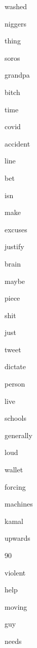 \documentclass[varwidth]{standalone}
\begin{document}
\begin{CJK*}{UTF8}{gbsn}
{{{\colorbox{red!3.695000171661377}{\strut washed}
\colorbox{red!12.72170639038086}{\strut niggers}
\colorbox{red!13.21385383605957}{\strut thing}
\colorbox{red!12.35820198059082}{\strut soros}
\colorbox{red!11.195777893066406}{\strut grandpa}
\colorbox{red!1.2797343730926514}{\strut bitch}
\colorbox{red!9.930908203125}{\strut time}
\colorbox{red!13.842358589172363}{\strut covid}
\colorbox{red!9.157684326171875}{\strut accident}
\colorbox{red!9.801695823669434}{\strut line}
\colorbox{red!11.14346694946289}{\strut bet}
\colorbox{red!11.951952934265137}{\strut isn}
\colorbox{red!12.36168098449707}{\strut make}
\colorbox{red!6.34499454498291}{\strut excuses}
\colorbox{red!5.187213897705078}{\strut justify}
\colorbox{red!11.700725555419922}{\strut brain}
\colorbox{red!11.259617805480957}{\strut maybe}
\colorbox{red!6.049976348876953}{\strut piece}
\colorbox{red!5.421172142028809}{\strut shit}
\colorbox{red!10.404735565185547}{\strut just}
\colorbox{red!11.056079864501953}{\strut tweet}
\colorbox{red!13.45838451385498}{\strut dictate}
\colorbox{red!6.308839797973633}{\strut person}
\colorbox{red!6.482020378112793}{\strut live}
\colorbox{red!5.7783966064453125}{\strut schools}
\colorbox{red!6.54176139831543}{\strut generally}
\colorbox{red!6.977139949798584}{\strut loud}
\colorbox{red!8.854361534118652}{\strut wallet}
\colorbox{red!8.163307189941406}{\strut forcing}
\colorbox{red!5.255404949188232}{\strut machines}
\colorbox{red!13.0840482711792}{\strut kamal}
\colorbox{red!7.055063247680664}{\strut upwards}
\colorbox{red!8.434107780456543}{\strut 90}
\colorbox{red!7.170428276062012}{\strut violent}
\colorbox{red!7.938457489013672}{\strut help}
\colorbox{red!6.661723613739014}{\strut moving}
\colorbox{red!8.856103897094727}{\strut guy}
\colorbox{red!5.558017253875732}{\strut needs}

}}}
\end{CJK*}
\end{document}

